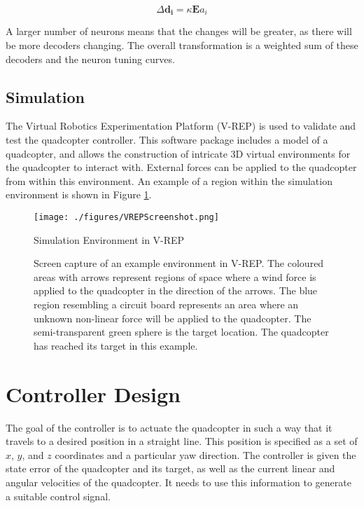 \documentclass[letterpaper, 10 pt, conference]{ieeeconf}  %
\begin{document}
\begin{equation} \label{eq:PES}
\Delta \bm{d_{i}} = \kappa \bm{E} a_{i}
\end{equation}

A larger number of neurons means that the changes will be greater, as there will be more decoders changing. The overall transformation is a weighted sum of these decoders and the neuron tuning curves. 

\subsection{Simulation}

The Virtual Robotics Experimentation Platform (V-REP) \cite{vrep} is used to validate and test the quadcopter controller.
This software package includes a model of a quadcopter, and allows the construction of intricate 3D virtual environments for the quadcopter to interact with.
External forces can be applied to the quadcopter from within this environment.
An example of a region within the simulation environment is shown in Figure \ref{fig:vrep_screenshot}.

\begin{figure}
\centering
\texttt{[image: ./figures/VREPScreenshot.png]}
\caption{Simulation Environment in V-REP}
\label{fig:vrep_screenshot}
\captionsetup{singlelinecheck=off,font=footnotesize}
\caption*{
Screen capture of an example environment in V-REP. The coloured areas with arrows represent regions of space where a wind force is applied to the quadcopter in the direction of the arrows. The blue region resembling a circuit board represents an area where an unknown non-linear force will be applied to the quadcopter. The semi-transparent green sphere is the target location. The quadcopter has reached its target in this example.}
\end{figure}

\section{Controller Design}

The goal of the controller is to actuate the quadcopter in such a way that it travels to a desired position in a straight line. 
This position is specified as a set of $x$, $y$, and $z$ coordinates and a particular yaw direction. 
The controller is given the state error of the quadcopter and its target, as well as the current linear and angular velocities of the quadcopter. 
It needs to use this information to generate a suitable control signal.
\end{document}

